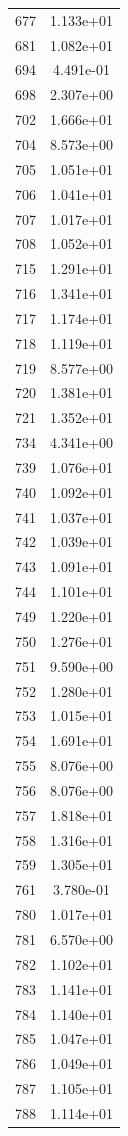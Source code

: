 \documentclass[12pt]{article}
\begin{document}
\begin{longtable}{@{}cc@{}}
677 & 1.133e+01 \\
681 & 1.082e+01 \\
694 & 4.491e-01 \\
698 & 2.307e+00 \\
702 & 1.666e+01 \\
704 & 8.573e+00 \\
705 & 1.051e+01 \\
706 & 1.041e+01 \\
707 & 1.017e+01 \\
708 & 1.052e+01 \\
715 & 1.291e+01 \\
716 & 1.341e+01 \\
717 & 1.174e+01 \\
718 & 1.119e+01 \\
719 & 8.577e+00 \\
720 & 1.381e+01 \\
721 & 1.352e+01 \\
734 & 4.341e+00 \\
739 & 1.076e+01 \\
740 & 1.092e+01 \\
741 & 1.037e+01 \\
742 & 1.039e+01 \\
743 & 1.091e+01 \\
744 & 1.101e+01 \\
749 & 1.220e+01 \\
750 & 1.276e+01 \\
751 & 9.590e+00 \\
752 & 1.280e+01 \\
753 & 1.015e+01 \\
754 & 1.691e+01 \\
755 & 8.076e+00 \\
756 & 8.076e+00 \\
757 & 1.818e+01 \\
758 & 1.316e+01 \\
759 & 1.305e+01 \\
761 & 3.780e-01 \\
780 & 1.017e+01 \\
781 & 6.570e+00 \\
782 & 1.102e+01 \\
783 & 1.141e+01 \\
784 & 1.140e+01 \\
785 & 1.047e+01 \\
786 & 1.049e+01 \\
787 & 1.105e+01 \\
788 & 1.114e+01 \\

\end{longtable}
\end{document}

